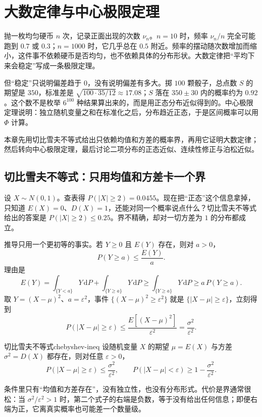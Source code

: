 \section{大数定律与中心极限定理}

抛一枚均匀硬币 $n$ 次，记录正面出现的次数 $\nu_n$。$n=10$ 时，频率 $\nu_n/n$ 完全可能跑到 $0.7$ 或 $0.3$；$n=1000$ 时，它几乎总在 $0.5$ 附近。频率的摆动随次数增加而缩小，这件事不依赖硬币是否均匀，也不依赖具体的分布形状。大数定律把“平均下来会稳定”写成一条极限定理。

但“稳定”只说明偏差趋于 $0$，没有说明偏差有多大。掷 $100$ 颗骰子，总点数 $S$ 的期望是 $350$，标准差是 $\sqrt{100\cdot 35/12}\approx 17.08$；$S$ 落在 $350\pm 30$ 内的概率约为 $0.92$。这个数不是枚举 $6^{100}$ 种结果算出来的，而是用正态分布近似得到的。中心极限定理说明：独立随机变量之和在标准化之后，分布趋近正态，于是区间概率可以用 $\Phi$ 计算。

本章先用切比雪夫不等式给出只依赖均值和方差的概率界，再用它证明大数定律；然后转向中心极限定理，最后讨论二项分布的正态近似、连续性修正与泊松近似。

\subsection{切比雪夫不等式：只用均值和方差卡一个界}

设 $X\sim N(0,1)$。查表得 $P(|X|\ge2)=0.0455$。现在把“正态”这个信息拿掉，只知道 $E(X)=0$、$D(X)=1$，还能对同一个概率说点什么？切比雪夫不等式给出的答案是 $P(|X|\ge2)\le 0.25$。界不精确，却对一切方差为 $1$ 的分布都成立。

推导只用一个更初等的事实。若 $Y\ge0$ 且 $E(Y)$ 存在，则对 $a>0$，
\[
P(Y\ge a)\le \frac{E(Y)}{a}.
\]
理由是
\[
E(Y)=\int_{\{Y<a\}}Y\,\mathrm dP+\int_{\{Y\ge a\}}Y\,\mathrm dP
\ge \int_{\{Y\ge a\}}Y\,\mathrm dP
\ge a\,P(Y\ge a).
\]
取 $Y=(X-\mu)^2$、$a=\varepsilon^2$，事件 $\{(X-\mu)^2\ge\varepsilon^2\}$ 就是 $\{|X-\mu|\ge\varepsilon\}$，立刻得到
\[
P(|X-\mu|\ge\varepsilon)
\le \frac{E[(X-\mu)^2]}{\varepsilon^2}
=\frac{\sigma^2}{\varepsilon^2}.
\]

\begin{mydef}{切比雪夫不等式}{chebyshev-ineq}
设随机变量 $X$ 的期望 $\mu=E(X)$ 与方差 $\sigma^2=D(X)$ 都存在，则对任意 $\varepsilon>0$，
\[
P(|X-\mu|\ge\varepsilon)\le\frac{\sigma^2}{\varepsilon^2},
\qquad
P(|X-\mu|<\varepsilon)\ge1-\frac{\sigma^2}{\varepsilon^2}.
\]
\end{mydef}

条件里只有“均值和方差存在”，没有独立性，也没有分布形式。代价是界通常很松：当 $\sigma^2/\varepsilon^2>1$ 时，第二个式子的右端是负数，等于没有给出任何信息；即便右端为正，它离真实概率也可能差一个数量级。

